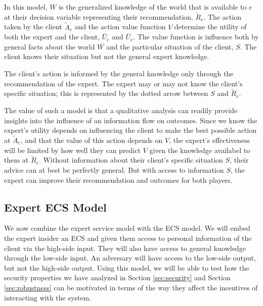 \documentclass[../thesis.tex]{subfiles}
\begin{document}
In this model, $W$ is the generalized knowledge of the world that
is available to $e$ at their decision variable representing
their recommendation, $\tilde{R}_e$.
The action taken by the client $\tilde{A}_c$ and the
action value function $V$ determine the utility of
both the expert and the client, $\breve{U_e}$ and $\breve{U_c}$.
The value function is influence both by general facts about
the world $W$ and the particular situation of the client, $S$.
The client knows their situation but not the general expert knowledge.

The client's action is informed by the general knowledge only
through the recommendation of the expert.
The expert may or may not know the client's specific situation;
this is represented by the dotted arrow between $S$ and $\tilde{R}_e$.

The value of such a model is that a qualitative analysis
can readily provide insights into the influence of an
information flow on outcomes.
Since we know the expert's utility depends on influencing
the client to make the best possible action at $\tilde{A}_c$,
and that the value of this action depends on $V$,
the expert's effectiveness will be limited by how well
they can predict $V$ given the knowledge availabel to them
at $\tilde{R}_e$.
Without information about their client's specific situation $S$,
their advice can at best be perfectly general.
But with access to information $S$, the expert can improve
their recommendation and outcomes for both players.

\subsection{Expert ECS Model}
\label{sec:expert-ecs-model}

We now combine the expert service model with
the ECS model.
We will embed the expert insider an ECS and given them
access to personal information of the client via the
high-side input.
They will also have access to general knowledge
through the low-side input.
An adversary will have access to the low-side output,
but not the high-side output.
Using this model, we will be able to test how
the security properties we have analyzed in
Section \ref{sec:security}
and Section \ref{sec:robustness} can
be motivated in terms of the way they
affect the incentives of interacting with the
system.
\end{document}
